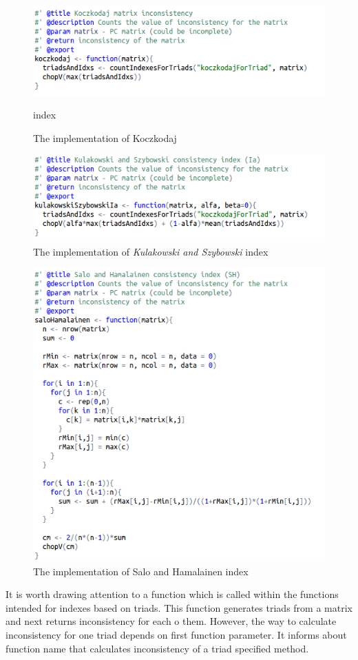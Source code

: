\begin{figure}[h]
\centerline{\includegraphics[scale=0.75]{images/kod2.png}}
\caption{The implementation of Koczkodaj} index
\label{fig:rstudio}
\end{figure}

\begin{figure}[h]
\centerline{\includegraphics[scale=0.75]{images/kod3.png}}
\caption{The implementation of \textit{Kulakowski and Szybowski} index}
\label{fig:rstudio}
\end{figure}

\begin{figure}[h]
\centerline{\includegraphics[scale=0.75]{images/kod4.png}}
\caption{The implementation of Salo and Hamalainen index}
\label{fig:rstudio}
\end{figure}
It is worth drawing attention to a function which is called within the functions intended for indexes based on triads. This function generates triads from a matrix and next returns inconsistency for each o them. However, the way to calculate inconsistency for one triad depends on first function parameter. It informs about function name that calculates inconsistency of a triad specified method.


